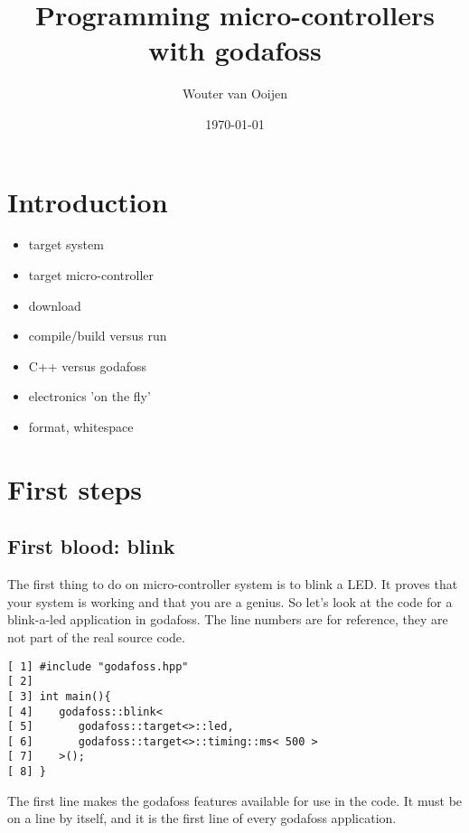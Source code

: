 \documentclass{article}
\author{Wouter van Ooijen}
\title{Programming micro-controllers with godafoss}
\date{\today}
\begin{document}
\maketitle

\section{Introduction}

\begin{itemize}
\item  target system
\item  target micro-controller
\item  download
\item  compile/build versus run
\item  C++ versus godafoss
\item  electronics 'on the fly'
\item  format, whitespace
\end{itemize}

\section{First steps}

\subsection{First blood: blink}

The first thing to do on micro-controller system is to blink a LED.
It proves that your system is working and that you are a genius.
So let's look at the code for a blink-a-led application in godafoss.
The line numbers are for reference, they are not part of the real
source code.

\lstset {language=C++}
\begin{lstlisting}
[ 1] #include "godafoss.hpp"
[ 2] 
[ 3] int main(){
[ 4]    godafoss::blink< 
[ 5]       godafoss::target<>::led, 
[ 6]       godafoss::target<>::timing::ms< 500 > 
[ 7]    >();
[ 8] }
\end{lstlisting}

The first line makes the godafoss features available for use in the code.
It must be on a line by itself, and it is the first line of every godafoss
application.
\end{document}
